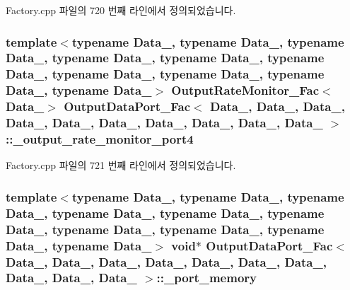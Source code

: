Factory.\+cpp 파일의 720 번째 라인에서 정의되었습니다.

\subsubsection[{\texorpdfstring{\+\_\+output\+\_\+rate\+\_\+monitor\+\_\+port4}{_output_rate_monitor_port4}}]{\setlength{\rightskip}{0pt plus 5cm}template$<$typename Data\+\_, typename Data\+\_, typename Data\+\_, typename Data\+\_, typename Data\+\_, typename Data\+\_, typename Data\+\_, typename Data\+\_, typename Data\+\_, typename Data\+\_$>$ {\bf Output\+Rate\+Monitor\+\_\+\+Fac}$<$Data\+\_$>$ {\bf Output\+Data\+Port\+\_\+\+Fac}$<$ Data\+\_, Data\+\_, Data\+\_, Data\+\_, Data\+\_, Data\+\_, Data\+\_, Data\+\_, Data\+\_, Data\+\_ $>$\+::\+\_\+output\+\_\+rate\+\_\+monitor\+\_\+port4\hspace{0.3cm}{\ttfamily [private]}}\hypertarget{classOutputDataPort__Fac_af620f4f1d7863aafddbdfeb8665a4273}{}\label{classOutputDataPort__Fac_af620f4f1d7863aafddbdfeb8665a4273}


Factory.\+cpp 파일의 721 번째 라인에서 정의되었습니다.

\subsubsection[{\texorpdfstring{\+\_\+port\+\_\+memory}{_port_memory}}]{\setlength{\rightskip}{0pt plus 5cm}template$<$typename Data\+\_, typename Data\+\_, typename Data\+\_, typename Data\+\_, typename Data\+\_, typename Data\+\_, typename Data\+\_, typename Data\+\_, typename Data\+\_, typename Data\+\_$>$ void$\ast$ {\bf Output\+Data\+Port\+\_\+\+Fac}$<$ Data\+\_, Data\+\_, Data\+\_, Data\+\_, Data\+\_, Data\+\_, Data\+\_, Data\+\_, Data\+\_, Data\+\_ $>$\+::\+\_\+port\+\_\+memory\hspace{0.3cm}{\ttfamily [private]}}\hypertarget{classOutputDataPort__Fac_ac7d5619e0c34eaa1f1b29df8020e918e}{}\label{classOutputDataPort__Fac_ac7d5619e0c34eaa1f1b29df8020e918e}


